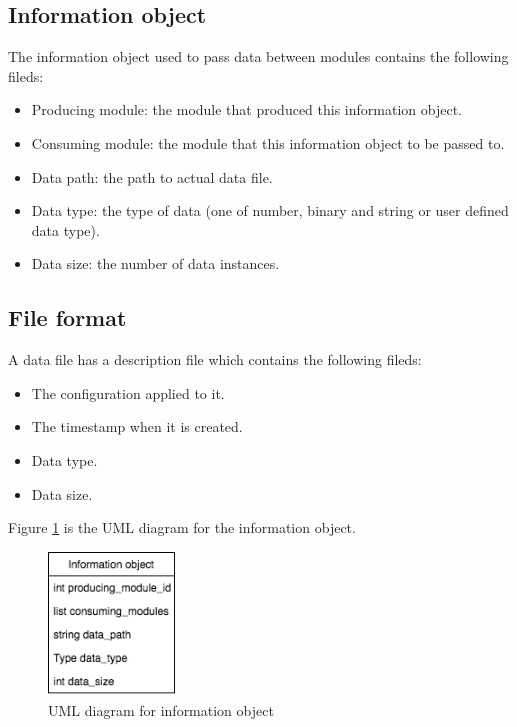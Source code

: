 \documentclass{article}
\begin{document}
    \subsection{Information object}
    The information object used to pass data between modules contains the following fileds:

    \begin{itemize}
        \item Producing module: the module that produced this information object.
        \item Consuming module: the module that this information object to be passed to.
        \item Data path: the path to actual data file.
        \item Data type: the type of data (one of number, binary and string or user defined data type).
        \item Data size: the number of data instances.
    \end{itemize}

    \subsection{File format}
    A data file has a description file which contains the following fileds:

    \begin{itemize}
        \item The configuration applied to it.
        \item The timestamp when it is created.
        \item Data type.
        \item Data size.
    \end{itemize}

    Figure \ref{fig:infomation_obj_uml} is the UML diagram for the information object.

    \begin{figure}[H]
        \begin{center}
            \includegraphics[width=0.3\textwidth]{fig/infomation_obj_uml.png}
        \end{center}
        \label{fig:infomation_obj_uml}
        \caption{UML diagram for information object}
    \end{figure}
\end{document}
